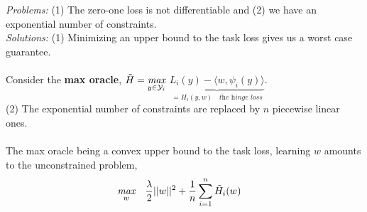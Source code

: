 \documentclass{article}
\begin{document}
\textit{Problems:} (1) The zero-one loss is not differentiable and (2) we have an exponential number of constraints.\\
\textit{Solutions:} (1) Minimizing an upper bound to the task loss gives us a worst case guarantee.
\\
\\
Consider the \textbf{max oracle}, $\Tilde{H}= \underset{y\in\mathcal{Y}_{i}}{\textit{max}}$ $\underbrace{L_{i}(y)- \langle w, \psi_{i}(y)\rangle}_{= H_{i}(y,w)\quad\textit{the hinge loss}}$.\\
(2) The exponential number of constraints are replaced by $n$ piecewise linear ones.\\
\\
The max oracle being a convex upper bound to the task loss, learning $w$ amounts to the unconstrained problem,
\begin{equation*}
\begin{aligned}
    &\underset{w}{\textit{max}}\quad\frac{\lambda}{2}||w||^{2}+ \frac{1}{n}\sum_{i=1}^{n}\Tilde{H}_{i}(w)
\end{aligned}
\end{equation*}
\end{document}
